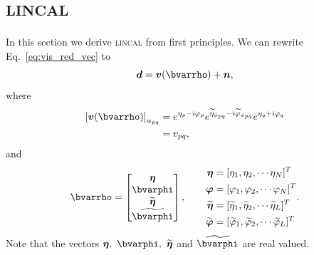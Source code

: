 \documentclass[useAMS,usenatbib]{mn2e}
\newcommand{\bd}{\bmath{d}}
\newcommand{\bv}{\bmath{v}}
\newcommand{\bn}{\bmath{n}}
\begin{document}
\section{\textsc{lincal}}
\label{sec:lincal}
In this section we derive \textsc{lincal} \citep{Liu2010} from first principles.
We can rewrite Eq.~\eqref{eq:vis_red_vec} to
\begin{equation}
\label{eq:lincal_vec}
\bd = \bv(\bvarrho) + \bn, 
\end{equation}
where 
\begin{align}
\left [ \bv(\bvarrho) \right ]_{\alpha_{pq}} &= e^{\eta_p - i \varphi_p} e^{\widetilde{\eta}_{\phi_{pq}}- i \widetilde{\varphi}_{\phi_{pq}}} e^{\eta_q + i \varphi_q}\\
&= v_{pq},
\end{align}
and
\begin{equation}
\bvarrho = 
\begin{bmatrix}
\bmath{\eta} \\
\bvarphi \\
\widetilde{\bmath{\eta}} \\
\widetilde{\bvarphi}
\end{bmatrix},\qquad
\begin{aligned}
\bmath{\eta} &= [\eta_1, \eta_2,\cdots \eta_N]^T\\
 \bmath{\varphi} &= [\varphi_1, \varphi_2,\cdots \varphi_N]^T\\
 \widetilde{\bmath{\eta}} &= [\widetilde{\eta}_1, \widetilde{\eta}_2,\cdots \widetilde{\eta}_L]^T\\
 \widetilde{\bmath{\varphi}} &= [\widetilde{\varphi}_1, \widetilde{\varphi}_2,\cdots \widetilde{\varphi}_L]^T
\end{aligned}.
\label{eq:help}
\end{equation}
Note that the vectors $\bmath{\eta},~\bvarphi,~\widetilde{\bmath{\eta}}$ and $\widetilde{\bvarphi}$ are real valued.
\end{document}
